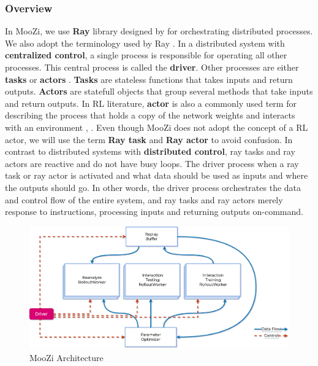 \documentclass[12pt]{article}
\begin{document}
\subsubsection{Overview}
In MooZi, we use \textbf{Ray} library designed by \citeauthor{RayDistributedFramework_Moritz.Nishihara.ea_2018}
for orchestrating distributed processes.
We also adopt the terminology used by Ray \cite{RayDistributedFramework_Moritz.Nishihara.ea_2018}.
In a distributed system with \textbf{centralized control}, a single process is responsible for operating all other processes.
This central process is called the \textbf{driver}.
Other processes are either \textbf{tasks} or \textbf{actors} .
\textbf{Tasks} are stateless functions that takes inputs and return outputs.
\textbf{Actors} are statefull objects that group several methods that take inputs and return outputs.
In RL literature, \textbf{actor} is also a commonly used term for describing the process that holds a copy of the network weights and interacts with an environment \cite{SEEDRLScalable_Espeholt.Marinier.ea_2020}, \cite{IMPALAScalableDistributed_Espeholt.Soyer.ea_2018}.
Even though MooZi does not adopt the concept of a RL actor, we will use the term \textbf{Ray task} and \textbf{Ray actor} to avoid confusion.
In contrast to distributed systems with \textbf{distributed control}, ray tasks and ray actors are reactive and do not have busy loops.
The driver process when a ray task or ray actor is activated and what data should be used as inputs and where the outputs should go.
In other words, the driver process orchestrates the data and control flow of the entire system, and ray tasks and ray actors merely response to instructions, processing inputs and returning outputs on-command.

\begin{figure}[ht]
    \centering
    \includegraphics[width=\textwidth]{assets/moozi_architecture.png}
    \caption[]{MooZi Architecture}
    \label{fig:moozi_architecture}
\end{figure}
\end{document}
